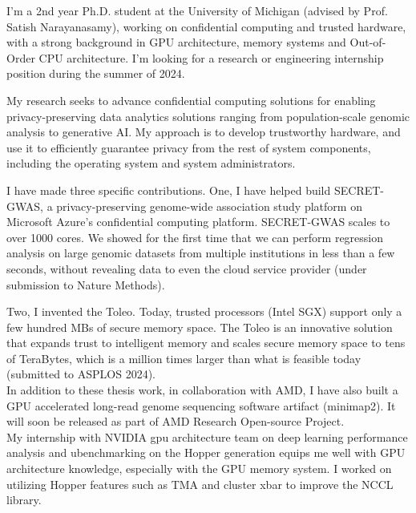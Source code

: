 I'm a 2nd year Ph.D. student at the University of Michigan (advised by Prof. Satish Narayanasamy), working on confidential computing and trusted hardware, with a strong background in GPU architecture, memory systems and Out-of-Order CPU architecture. I'm looking for a research or engineering internship position during the summer of 2024. \par
My research seeks to advance confidential computing solutions for enabling privacy-preserving data analytics solutions ranging from population-scale genomic analysis to generative AI.  My approach is to develop trustworthy hardware, and use it to efficiently guarantee privacy from the rest of system components, including the operating system and system administrators. \par

\vspace{3ex}

I have made three specific contributions. One, I have helped build SECRET-GWAS, a privacy-preserving genome-wide association study platform on Microsoft Azure's confidential computing platform. SECRET-GWAS scales to over 1000 cores. We showed for the first time that we can perform regression analysis on large genomic datasets from multiple institutions in less than a few seconds, without revealing data to even the cloud service provider (under submission to Nature Methods). \par

Two, I invented the Toleo. Today, trusted processors (Intel SGX) support only a few hundred MBs of secure memory space. The Toleo is an innovative solution that expands trust to intelligent memory and scales secure memory space to tens of TeraBytes, which is a million times larger than what is feasible today (submitted to ASPLOS 2024).\\

In addition to these thesis work, in collaboration with AMD, I have also built a GPU accelerated long-read genome sequencing software artifact (minimap2). It will soon be released as part of AMD Research Open-source Project. \\

My internship with NVIDIA gpu architecture team on deep learning performance analysis and ubenchmarking on the Hopper generation equips me well with GPU architecture knowledge, especially with the GPU memory system. I worked on utilizing Hopper features such as TMA and cluster xbar to improve the NCCL library. \\

